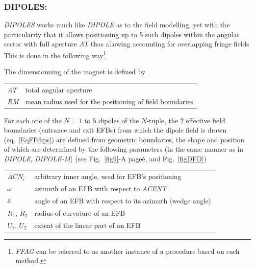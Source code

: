 \newpage

\subsubsection*{DIPOLES: \DIPOLESTitl~\cite{reportNIMFFAG}} \label{DIPOLES} 
\medskip

\noindent \textsl{DIPOLES} works much like \textsl{DIPOLE} 
as to the field modelling, yet with the particularity that it allows positioning up to 5 such 
dipoles within the angular sector with full aperture $AT$ thus allowing 
accounting for overlapping fringe fields  
This is done in the following 
way\footnote{\textsl{FFAG} can be referred to as another instance of a procedure based on such method.}

\bigskip

\noindent  The dimensionning of the magnet is defined by

\bigskip

 \begin{tabular}{>{\sl}l!{:}l}
	 AT &  total angular aperture \\
	 RM & mean radius used for the positioning of field boundaries\\
 \end{tabular}

\bigskip

\noindent For each one of the $N=1$ to $5$ dipoles of the  $N$-tuple, 
the 2 effective field boundaries (entrance and exit EFBs) from which  the dipole field  is drawn (eq.~\ref{EqFFdips}) are
defined from geometric boundaries, the shape and position of which are determined by the 
following parameters (in the same manner as in \textsl{DIPOLE}, \textsl{DIPOLE-M})
 (see Fig.~\ref{fig9}-A pageé\pageref{fig9}, and Fig.~\ref{figDFD}) 

\bigskip

\begin{tabular}{l!{:}l}
	$ACN_i$  & arbitrary inner angle, used for EFB's positioning  \\
	$\omega$ &  azimuth of an EFB with respect to  \textsl{ACENT}\\
	$\theta$ & angle of an EFB with respect to its azimuth (wedge angle)\\ 
	$R_1$, $R_2$  &  radius of curvature of an EFB\\
	$U_1$, $U_2$  &  extent of the linear part of an EFB  \\
\end{tabular}

